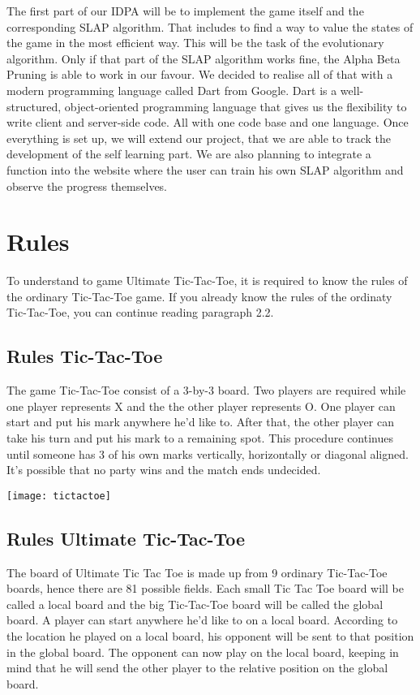 The first part of our IDPA will be to implement the game itself and the corresponding SLAP algorithm. 
That includes to find a way to value the states of the game in the most efficient way. This will be the task of the evolutionary algorithm. Only if that part of the SLAP algorithm works fine, the Alpha Beta Pruning is able to work in our favour.
We decided to realise all of that with a modern programming language called Dart from Google. Dart is a well-structured, object-oriented programming language that gives us the flexibility to write client and server-side code. All with one code base and one language. Once everything is set up, we will extend our project, that we are able to track the development of the self learning part. We are also planning to integrate a function into the website where the user can train his own SLAP algorithm and observe the progress themselves.

\section{Rules}
To understand to game Ultimate Tic-Tac-Toe, it is required to  know the rules of the ordinary Tic-Tac-Toe game. If you already know the rules of the ordinaty Tic-Tac-Toe, you can continue reading paragraph 2.2. 

\subsection {Rules Tic-Tac-Toe}
The game Tic-Tac-Toe consist of a 3-by-3 board. Two players are required while one player represents X and the the other player represents O. One player can start and put his mark anywhere he'd like to. After that, the other player can take his turn and put his mark to a remaining spot. This procedure continues until someone has 3 of his own marks vertically, horizontally or diagonal aligned. It's possible that no party wins and the match ends undecided.

\begin{fixedpic}
	\centering
	\texttt{[image: tictactoe]}
\end{fixedpic}


\subsection {Rules Ultimate Tic-Tac-Toe}
The board of Ultimate Tic Tac Toe is made up from 9 ordinary Tic-Tac-Toe boards, hence there are 81 possible fields.
Each small Tic Tac Toe board will be called a local board and the big Tic-Tac-Toe board will be called the global board.
A player can start anywhere he'd like to on a local board. According to the location he played on a local board, his opponent will be sent to that position in the global board. The opponent can now play on the local board, keeping in mind that he will send the other player to the relative position on the global board. 

